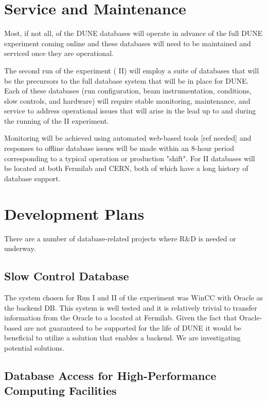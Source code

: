 \documentclass[../main-v1.tex]{subfiles}
\begin{document}
\section{Service and Maintenance}
\label{sec:db:service}  

Most, if not all, of the DUNE databases will operate in advance of the full DUNE experiment coming online and these databases will need to be maintained and serviced once they are operational. 

The second run of the  experiment ( II) will employ a suite of databases that will be the precursors to the full database system that will be in place for DUNE. Each of these databases (run configuration, beam instrumentation, conditions, slow controls, and hardware) will require stable monitoring, maintenance, and service to address operational issues that will arise in the lead up to and during the running of the  II experiment. 

Monitoring will be achieved using automated web-based tools [ref needed] and responses to offline database issues will be made within an 8-hour period corresponding to a typical operation or production "shift". For  II databases will be located at both Fermilab and CERN, both of which have a long history of database support.

\section{Development Plans}

There are a number of database-related projects where R\&D is needed or underway. 

\subsection{Slow Control Database}

The   system chosen for Run I and II of the  experiment was WinCC with Oracle as the backend DB. This system is well tested and it is relatively trivial to transfer information from the Oracle  to a   located at Fermilab. Given the fact that Oracle-based  are not guaranteed to be supported for the life of DUNE it would be beneficial to utilize a solution that enables a  backend.  We are investigating potential solutions. 

\subsection{Database Access for High-Performance Computing Facilities}
\end{document}
